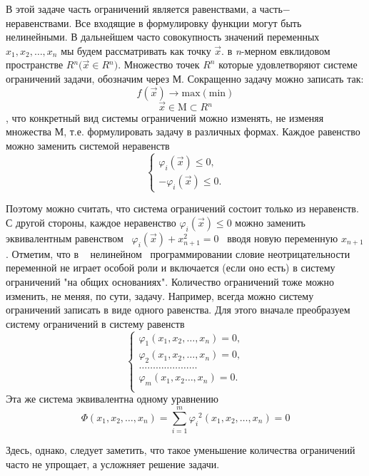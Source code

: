 В этой задаче часть ограничений является равенствами, а часть$-$\\неравенствами. Все входящие в формулировку функции могут быть нелинейными. В дальнейшем часто совокупность значений переменных \\$x_1,x_2,\ldots,x_n$ мы будем рассматривать как точку $\vec x.$ в \textit {n}-мерном евклидовом пространстве $ R{}^n\Biggl(\vec x\in R{}^n\Biggr).$ Множество точек \(R^n\) которые удовлетворяют системе ограничений задачи, обозначим через М. Сокращенно задачу можно записать так:
\[f(\vec x)\to\mathrm{max(min)}\]
\[\vec x\in \mathrm{M} \subset R{}^n\]
, что конкретный вид системы ограничений можно изменять, не изменяя множества М, т.е. формулировать задачу в различных формах. Каждое равенство можно заменить системой неравенств
\[
    \begin{cases}
        \varphi_i(\vec x)\leqslant 0,\\
       -\varphi_i(\vec x)\leqslant 0.
    \end{cases}
\]

Поэтому можно считать, что система ограничений состоит только из неравенств. С другой стороны, каждое неравенство $\varphi_i(\vec x)\le 0$ можно заменить эквивалентным равенством~ $\varphi_i(\vec x)+x_{n+1}^2 =  0$~ вводя новую переменную $x_{n+1}$. Отметим, что в ~ нелинейном~ программировании словие неотрицательности переменной не играет особой роли и включается (если оно есть) в систему ограничений "на общих основаниях". Количество ограничений тоже можно изменить, не меняя, по сути, задачу. Например, всегда можно систему ограничений записать в виде одного равенства. Для этого вначале преобразуем систему ограничений в систему равенств
\[
    \begin{cases}
        \varphi_1(x_1,x_2,\dots,x_n)=0,\\
        \varphi_2(x_1,x_2,\dots,x_n)=0,\\
        \dots\dots\dots\dots\dots\dots\dots\\
        \varphi_m(x_1,x_2\dots,x_n)=0.\\
    \end{cases}
\]
Эта же система эквивалентна одному  уравнению
\[\Phi(x_1,x_2,\dots,x_n)=\sum\limits_{i=1}^m \varphi_i{}^2(x_1,x_2,\dots,x_n)=0\]

Здесь, однако, следует заметить, что такое уменьшение количества ограничений часто не упрощает, а усложняет решение задачи.



